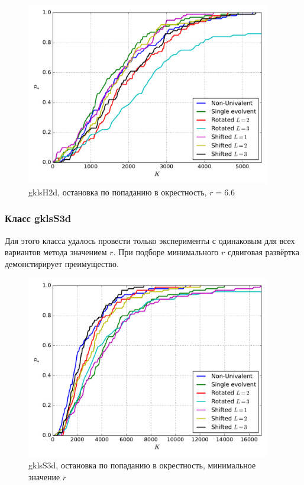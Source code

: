 \documentclass[a4paper]{article}
\begin{document}
\begin{figure}[H]
  \center
  \includegraphics[width=0.95\textwidth]{../gklsH2d/same_r/opt_point/gklsH2d_same_r_opt_pt_op.pdf}
  \caption{gklsH2d, остановка по попаданию в окрестность, $r=6.6$}
  \label{fig:}
\end{figure}

\subsubsection{Класс gklsS3d}
Для этого класса удалось провести только эксперименты с одинаковым для всех вариантов метода значением $r$.
При подборе минимального $r$ сдвиговая развёртка демонстирирует преимущество.

\begin{figure}
  \center
  \includegraphics[width=0.95\textwidth]{../gklsS3d/opt_point/gklsS3d_opt_pt_op.pdf}
  \caption{gklsS3d, остановка по попаданию в окрестность, минимальное значение $r$}
  \label{fig:}
\end{figure}
\end{document}
